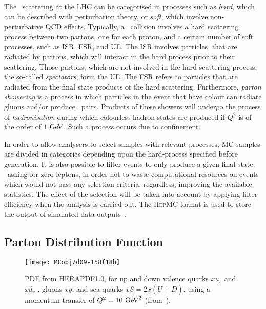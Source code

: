 		The \pp\ scattering at the \ac{LHC} can be categorised in processes such as \emph{hard}, which can be described with perturbation theory, or \emph{soft}, which involve non-perturbative \ac{QCD} effects. Typically, a \pp\ collision involves a hard scattering process between two partons, one for each proton, and a certain number of soft processes, such as \ac{ISR}, \ac{FSR}, and \ac{UE}. The \ac{ISR} involves particles, that are radiated by partons, which will interact in the hard process prior to their scattering. Those partons, which are not involved in the hard scattering process, the so-called \emph{spectators}, form the \ac{UE}. The \ac{FSR} refers to particles that are radiated from the final state products of the hard scattering. Furthermore, \emph{parton showering} is a process in which particles in the event that have colour can radiate gluons and/or produce \qqbar\ pairs. Products of these showers will undergo the process of \emph{hadronisation} during which colourless hadron states are produced if $Q^2$ is of the order of $1 \GeV$. Such a process occurs due to confinement. 

		In order to allow analysers to select samples with relevant processes, \ac{MC} samples are divided in categories depending upon the hard-process specified before generation. It is also possible to filter events to only produce a given final state, \eg\ asking for zero leptons, in order not to waste computational resources on events which would not pass any selection criteria, regardless, improving the available statistics. The effect of the selection will be taken into account by applying filter efficiency when the analysis is carried out. The \textsc{HepMC} format is used to store the output of simulated data outputs~\cite{DOBBS200141}.
		

		\subsection*{Parton Distribution Function}

			\begin{wrapfigure}{L}{.5\textwidth}
				\centering
				\texttt{[image: MCobj/d09-158f18b]}
				\caption{\label{fig:HERAPDF} PDF from \textsc{HERAPDF1.0}, for up and down valence quarks $xu_v$ and $xd_v$ , gluons $xg$, and sea quarks $xS = 2x(\bar{U} + \bar{D})$, using a momentum transfer of $Q^2 =10 \GeV^2$ (from~\cite{Aaron:2009aa}).}
			\end{wrapfigure}

